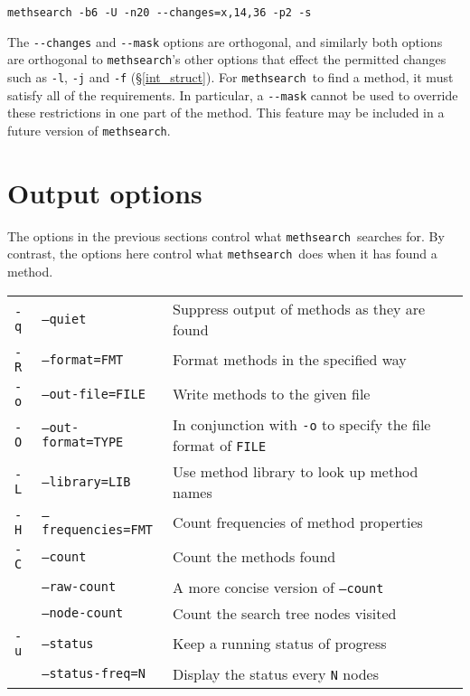 \documentclass[a4paper,11pt,oneside]{book}
\def\methsearch{\texttt{meth\-search}}
\newcommand{\sref}[1]{\hyperref[#1]{\S\ref{#1}}}
\begin{document}
\begin{Verbatim}
methsearch -b6 -U -n20 --changes=x,14,36 -p2 -s
\end{Verbatim}

The \verb+--changes+ and \verb+--mask+ options are orthogonal, and similarly
both options are orthogonal to \methsearch's other options that effect the
permitted changes such as \verb+-l+, \verb+-j+ and \verb+-f+ 
(\sref{int_struct}).  For \methsearch\ to find a method, it must satisfy all
of the requirements.  In particular, a \verb+--mask+ cannot be used to 
override these restrictions in one part of the method.  This feature
may be included in a future version of \methsearch.


\section{Output options}\label{output_opt}

The options in the previous sections control what
\methsearch\ searches for.  By contrast, the options here control
what \methsearch\ does when it has found a method.

\begin{tabularx}{\textwidth}{llX}
\texttt{-q}&\texttt{--quiet}&Suppress output of methods as they are found\\
\texttt{-R}&\texttt{--format=FMT}&Format methods in the specified way\\
\texttt{-o}&\texttt{--out-file=FILE}&Write methods to the given file\\
\texttt{-O}&\texttt{--out-format=TYPE}&
  In conjunction with \texttt{-o} to specify the file format of \texttt{FILE}\\
\texttt{-L}&\texttt{--library=LIB}&Use method library to look up method names\\
\texttt{-H}&\texttt{--frequencies=FMT}&Count frequencies of method properties\\
\texttt{-C}&\texttt{--count}&Count the methods found\\
&\texttt{--raw-count}&A more concise version of \texttt{--count}\\
&\texttt{--node-count}&Count the search tree nodes visited\\
\texttt{-u}&\texttt{--status}&Keep a running status of progress\\
&\texttt{--status-freq=N}&Display the status every \texttt{N} nodes\\
\end{tabularx}
\end{document}
